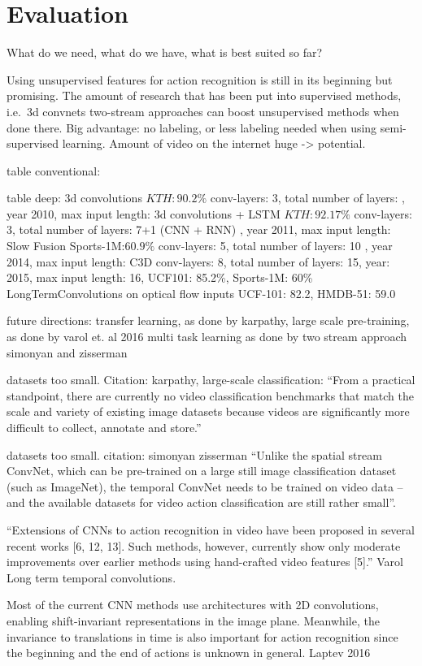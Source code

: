 \section{Evaluation}
What do we need, what do we have, what is best suited so far?

Using unsupervised features for action recognition is still in its beginning but promising.
The amount of research that has been put into supervised methods, i.e.\ 3d convnets two-stream approaches can boost unsupervised methods when done there.
Big advantage: no labeling, or less labeling needed when using semi-supervised learning.
Amount of video on the internet huge -> potential.

table conventional:

table deep:
3d convolutions \cite{ji_3d_2013}  $KTH:90.2\%$ conv-layers: 3, total number of layers: , year 2010, max input length:
3d convolutions + LSTM \cite{baccouche_sequential_2011} $KTH:92.17\%$ conv-layers: 3, total number of layers: 7+1 (CNN + RNN) , year 2011, max input length:
Slow Fusion \cite{karpathy_large-scale_2014} Sports-1M:$60.9\%$ conv-layers: 5, total number of layers: 10 , year 2014, max input length: 
C3D conv-layers: 8, total number of layers: 15, year: 2015, max input length: 16, UCF101: 85.2\%, Sports-1M: 60\%
LongTermConvolutions on optical flow inputs UCF-101: 82.2, HMDB-51: 59.0


future directions: transfer learning, as done by karpathy, large scale
pre-training, as done by varol et. al 2016
multi task learning as done by two stream approach simonyan and zisserman

datasets too small. Citation: karpathy, large-scale classification: ``From a practical standpoint, there are currently no video classification benchmarks that match the scale and variety of existing image datasets because videos are significantly more difficult to collect, annotate and store.''

datasets too small. citation: simonyan zisserman ``Unlike the spatial stream ConvNet, which can be pre-trained on a large still image classification dataset (such as ImageNet), the temporal ConvNet needs to be trained on video data – and the available datasets for video action classification are still rather small''.


``Extensions of CNNs to action recognition in video have been proposed in several recent works [6, 12, 13]. Such methods, however, currently show only moderate improvements over earlier methods using hand-crafted video features [5].''
Varol Long term temporal convolutions.

Most of the current CNN methods use architectures with 2D convolutions, enabling shift-invariant representations in the image plane. Meanwhile, the invariance to translations in time is also important for action recognition since the beginning and the end of actions is unknown in general. Laptev 2016

